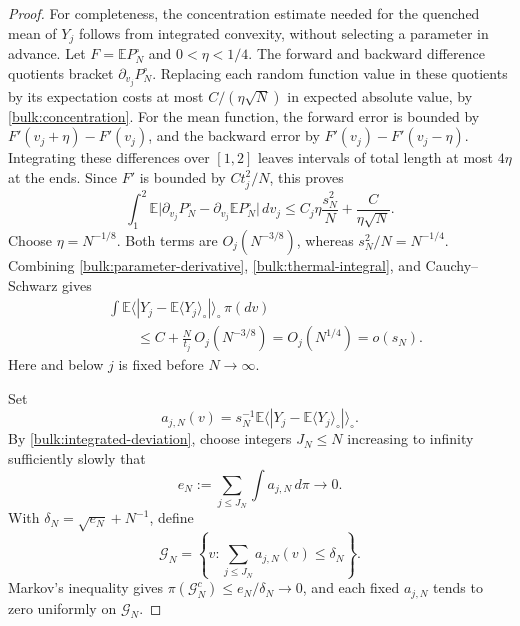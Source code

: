 \begin{proof}
For completeness, the concentration estimate needed for the quenched
mean of $Y_j$ follows from integrated convexity, without selecting a
parameter in advance.  Let $F=\mathbb E P_N^\circ$ and
$0<\eta<1/4$.  The forward and backward difference quotients bracket
$\partial_{v_j}P_N^\circ$.  Replacing each random function value in these
quotients by its expectation costs at most $C/(\eta\sqrt N)$ in
expected absolute value, by \eqref{bulk:concentration}.  For the mean
function, the forward error is bounded by
$F'(v_j+\eta)-F'(v_j)$, and the backward error by
$F'(v_j)-F'(v_j-\eta)$.  Integrating these differences over $[1,2]$
leaves intervals of total length at most $4\eta$ at the ends.  Since
$F'$ is bounded by $Ct_j^2/N$, this proves
\begin{equation}\label{bulk:convex-fluctuation}
 \int_1^2\mathbb E
 \big|\partial_{v_j}P_N^\circ-\partial_{v_j}\mathbb E P_N^\circ\big|
 \,dv_j
 \le C_j\eta\frac{s_N^2}{N}+\frac{C}{\eta\sqrt N}.
\end{equation}
Choose $\eta=N^{-1/8}$.  Both terms are $O_j(N^{-3/8})$, whereas
$s_N^2/N=N^{-1/4}$.  Combining
\eqref{bulk:parameter-derivative}, \eqref{bulk:thermal-integral}, and
Cauchy--Schwarz gives
\begin{align}
 &\int\mathbb E\big\langle
       |Y_j-\mathbb E\langle Y_j\rangle_\circ|
     \big\rangle_\circ\,\pi(dv) \nonumber\\
 &\qquad\le C+\frac{N}{t_j}\,O_j(N^{-3/8})
   =O_j(N^{1/4})=o(s_N).
 \label{bulk:integrated-deviation}
\end{align}
Here and below $j$ is fixed before $N\to\infty$.

Set
\[
 a_{j,N}(v)=s_N^{-1}\mathbb E\big\langle
   |Y_j-\mathbb E\langle Y_j\rangle_\circ|
 \big\rangle_\circ.
\]
By \eqref{bulk:integrated-deviation}, choose integers $J_N\le N$
increasing to infinity sufficiently slowly that
\[
 e_N:=\sum_{j\le J_N}\int a_{j,N}\,d\pi\longrightarrow0.
\]
With $\delta_N=\sqrt{e_N}+N^{-1}$, define
\[
 \mathcal G_N=\left\{v:\sum_{j\le J_N}a_{j,N}(v)\le\delta_N\right\}.
\]
Markov's inequality gives
$\pi(\mathcal G_N^c)\le e_N/\delta_N\to0$, and each fixed
$a_{j,N}$ tends to zero uniformly on $\mathcal G_N$.


\end{proof}

